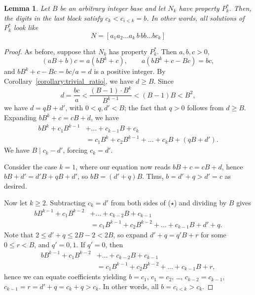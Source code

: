 \documentclass[sn-mathphys]{sn-jnl}%
\theoremstyle{thmstyleone}%
\newtheorem{lemma}[theorem]{Lemma}
\theoremstyle{thmstyletwo}%
\theoremstyle{thmstylethree}%
\begin{document}
\begin{appendices}
\begin{lemma} \label{lemma:last_block}
    Let $B$ be an arbitrary integer base and let $N_k$ have property 
    $P^*_k$.
    Then, the digits in the last block satisfy $c_k < c_{i < k} = b$.
    In other words, all solutions of $P^*_k$ look like \[
        N = [a_1a_2\dots a_k \,b\, b b\dots b c_k]
    \]
\end{lemma}
\begin{proof}
    As before, suppose that $N_k$ has property $P^*_k$. Then $a, b, c > 0$, \[
        (aB + b)c = a(bB^k + c), \qquad
        a(bB^k + c - Bc) = bc,
    \] and $bB^k + c - Bc = bc / a = d$ is a positive integer.
    By Corollary~\ref{corollary:trivial_ratio}, we have $d \geq B$. Since \[
        d = \frac{bc}{a} <\frac{(B - 1)\cdot B^k}{B^{k - 1}} < (B - 1)B < B^2,
    \] we have $d = qB + d'$, with $0 < q, d' < B$; the fact
    that $q > 0$ follows from $d \geq B$.
    Expanding $bB^k + c = cB + d$, we have \begin{align*}
        bB^k + c_1B^{k - 1} &+ \dots + c_{k - 1}B + c_k \\
            &= c_1B^k + c_2B^{k - 1} + \dots + c_kB + (qB + d'). \tag{$\star$}
    \end{align*}
    We have $B \mid c_k - d'$, forcing $c_k = d'$.

    Consider the case $k = 1$, where our equation now reads $bB + c = cB + d$, hence 
    $bB + d' = d'B + qB + d'$, so $bB = (d' + q)B$.
    Thus, $b = d' + q > d' = c$ as desired.

    Now let $k \geq 2$. Subtracting $c_k = d'$ from both sides of ($\star$) and dividing by $B$ 
    gives \begin{align*}
        bB^{k - 1} + c_1B^{k - 2} &+ \dots + c_{k - 2}B + c_{k - 1} \\
        &= c_1B^{k - 1} + c_2B^{k - 2} + \dots + c_{k - 1}B + d' + q.
    \end{align*}
    Note that $2 \leq d' + q \leq 2B - 2 < 2B$, so expand $d' + q = q'B + r$ for some 
    $0 \leq r < B$, and $q' = 0, 1$. If $q' = 0$,  then \begin{align*}
        bB^{k - 1} + c_1B^{k - 2} &+ \dots + c_{k - 2}B + c_{k - 1} \\
        &= c_1B^{k - 1} + c_2B^{k - 2} +\dots + c_{k - 1}B + r,
    \end{align*}
    hence we can equate coefficients yielding $b = c_1$, $c_1 = c_2$, \dots, $c_{k - 2} =
    c_{k - 1}$, $c_{k - 1} = r = d' + q = c_k + q > c_k$. In other words, all 
    $b = c_{i < k} > c_k$.


\end{proof}
\end{appendices}
\end{document}
